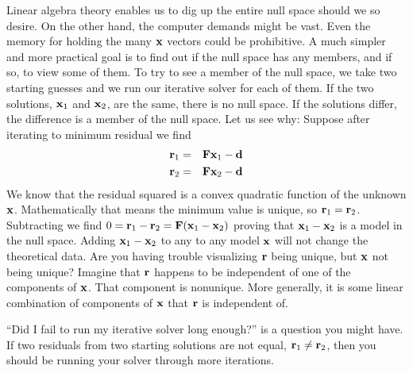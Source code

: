 \par
Linear algebra theory enables us to dig up the entire null space
should we so desire.
On the other hand, the computer demands might be vast.
Even the memory for holding the many $\bold x$ vectors could be prohibitive.
A much simpler and more practical goal
is to find out if the null space has any members,
and if so, to view some of them.
To try to see a member of the null space,
we take two starting guesses
and we run our iterative solver for each of them.
If the two solutions,
$\bold x_1$ and $\bold x_2$,
are the same, there is no null space.
If the solutions differ, the difference
is a member of the null space.
Let us see why:
Suppose after iterating to minimum residual we find
\begin{eqnarray}
\bold r_1 &=& \bold F\bold x_1 - \bold d
\\
\bold r_2 &=& \bold F\bold x_2 - \bold d 
\end{eqnarray}
We know that the residual squared is a convex quadratic function
of the unknown $\bold x$.
Mathematically that means the minimum value is unique,
so $\bold r_1 =\bold r_2$.
Subtracting
we find
$0=\bold r_1-\bold r_2 =\bold F(\bold x_1-\bold x_2)$
proving that $\bold x_1-\bold x_2$ is a model in the null space.
Adding $\bold x_1-\bold x_2$ to any to any model $\bold x$
will not change the theoretical data.
Are you having trouble visualizing $\bold r$ being unique,
but $\bold x$ not being unique?  Imagine that $\bold r$
happens to be independent of one of the components of $\bold x$.
That component is nonunique.
More generally, it is some linear combination of components of $\bold x$
that $\bold r$ is independent of.

\par
{}

\par
``Did I fail to run my iterative solver long enough?'' is
a question you might have.
If two residuals from two starting solutions are not equal,
$\bold r_1 \ne \bold r_2$,
then you should be running your solver through more iterations.

\par
{}

